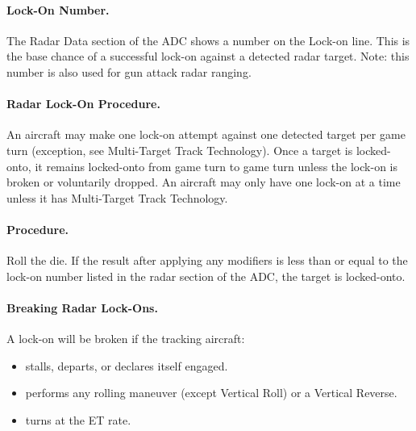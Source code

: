 {\paragraph{Lock-On Number.} The Radar Data section of the ADC shows a number on the Lock-on line. This is the base chance of a successful lock-on against a detected radar target. Note: this number is also used for gun attack radar ranging.

\paragraph{Radar Lock-On Procedure.} An aircraft may make one lock-on attempt against one detected target per game turn (exception, see Multi-Target Track Technology). Once a target is locked-onto, it remains locked-onto from game turn to game turn unless the lock-on is broken or voluntarily dropped. An aircraft may only have one lock-on at a time unless it has Multi-Target Track Technology.

\paragraph{Procedure.} Roll the die. If the result after applying any modifiers is less than or equal to the lock-on number listed in the radar section of the ADC, the target is locked-onto. 

\paragraph{Breaking Radar Lock-Ons.} A lock-on will be broken if the tracking aircraft:

\begin{itemize}

    \item stalls, departs, or declares itself engaged.

    \item performs any rolling maneuver (except Vertical Roll) or a Vertical Reverse.

    \item turns at the ET rate.


\end{itemize}}
